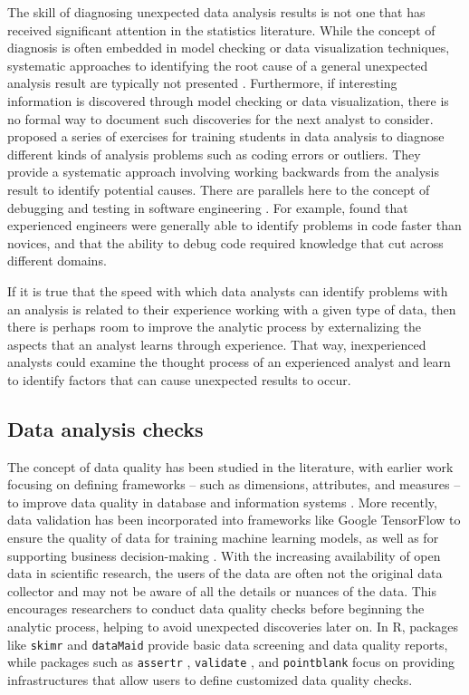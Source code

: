 \documentclass[
  12pt,
]{interact}
\begin{document}
The skill of diagnosing unexpected data analysis results is not one that
has received significant attention in the statistics literature. While
the concept of diagnosis is often embedded in model checking or data
visualization techniques, systematic approaches to identifying the root
cause of a general unexpected analysis result are typically not
presented \citep{peng2022perspective}. Furthermore, if interesting
information is discovered through model checking or data visualization,
there is no formal way to document such discoveries for the next analyst
to consider. \citet{peng_diagnosing_2021} proposed a series of exercises
for training students in data analysis to diagnose different kinds of
analysis problems such as coding errors or outliers. They provide a
systematic approach involving working backwards from the analysis result
to identify potential causes. There are parallels here to the concept of
debugging and testing in software engineering
\citep{donoghue2021teaching}. For example, \citet{li2019towards} found
that experienced engineers were generally able to identify problems in
code faster than novices, and that the ability to debug code required
knowledge that cut across different domains.

If it is true that the speed with which data analysts can identify
problems with an analysis is related to their experience working with a
given type of data, then there is perhaps room to improve the analytic
process by externalizing the aspects that an analyst learns through
experience. That way, inexperienced analysts could examine the thought
process of an experienced analyst and learn to identify factors that can
cause unexpected results to occur.

\subsection{Data analysis checks}\label{data-analysis-checks}

The concept of data quality has been studied in the literature, with
earlier work focusing on defining frameworks -- such as dimensions,
attributes, and measures -- to improve data quality in database and
information systems
\citep{wang1996beyond, batini2009methodologies, 6204995, woodall2014classification, cai2015challenges, 8642813}.
More recently, data validation has been incorporated into frameworks
like Google TensorFlow \citep{polyzotis2019data} to ensure the quality
of data for training machine learning models, as well as for supporting
business decision-making \citep{schelter2018automating}. With the
increasing availability of open data in scientific research, the users
of the data are often not the original data collector and may not be
aware of all the details or nuances of the data. This encourages
researchers to conduct data quality checks before beginning the analytic
process, helping to avoid unexpected discoveries later on. In R,
packages like \texttt{skimr} \citep{skimr} and \texttt{dataMaid}
\citep{dataMaid} provide basic data screening and data quality reports,
while packages such as \texttt{assertr} \citep{assertr},
\texttt{validate} \citep{validate}, and \texttt{pointblank}
\citep{pointblank} focus on providing infrastructures that allow users
to define customized data quality checks.
\end{document}
